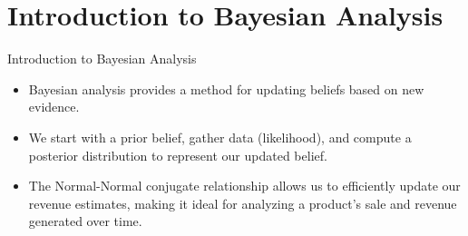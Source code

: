 \section{Introduction to Bayesian Analysis}

\begin{frame}{Introduction to Bayesian Analysis}

  \begin{itemize}
    \item Bayesian analysis provides a method for updating beliefs based on new evidence.
    \item We start with a prior belief, gather data (likelihood), and compute a posterior distribution to represent our updated belief.
    \item The Normal-Normal conjugate relationship allows us to efficiently update our revenue estimates, making it ideal for analyzing a product's sale and revenue generated over time.
  \end{itemize}
  
\end{frame}
